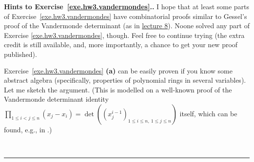 \documentclass[numbers=enddot,12pt,final,onecolumn,notitlepage]{scrartcl}%
\theoremstyle{definition}
\newenvironment{proof}[1][Proof]{\noindent\textbf{#1.} }{\ \rule{0.5em}{0.5em}}
\let\prodnonlimits\prod
\renewcommand{\prod}{\prodnonlimits\limits}
\newcommand{\tup}[1]{\left( #1 \right)}
\begin{document}
\begin{proof}[Hints to Exercise~\ref{exe.hw3.vandermondes}.]
I hope that at least some parts of Exercise~\ref{exe.hw3.vandermondes}
have combinatorial proofs similar to Gessel's proof of the Vandermonde
determinant (as in
\href{http://www-users.math.umn.edu/~dgrinber/5707s17/5707lec8.pdf}{lecture 8}).
Noone solved any part of Exercise \ref{exe.hw3.vandermondes}, though.
Feel free to continue trying (the extra credit is still available,
and, more importantly, a chance to get your new proof published).

Exercise~\ref{exe.hw3.vandermondes} \textbf{(a)} can be easily
proven if you know some abstract algebra (specifically, properties of
polynomial rings in several variables). Let me sketch the argument.
(This is modelled on a well-known proof of the Vandermonde determinant
identity
$\prod_{1\leq i<j\leq n} \left( x_j - x_i \right)
 =
 \det \tup{ \tup{ x_j^{i-1} }_{1\leq i\leq n, \  1\leq j\leq n } }$
itself, which can be found, e.g., in \cite[\S 17]{Garret10}.)


\end{proof}
\end{document}
